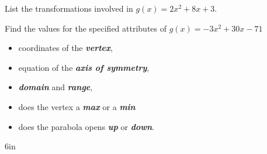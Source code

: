 \myProblems
{
    List the transformations involved in 
    \centering
    $g(x) = 2x^2 + 8x + 3$.
}
{
    Find the values for the specified attributes of
    {
    $g(x) = -3x^2 + 30x - 71$
    }
    \small
    \begin{itemize}[fullwidth,nosep,topsep=0.5\baselineskip]
        \item coordinates of the {\bfseries\itshape vertex},
        \item equation of the {\bfseries\itshape axis of symmetry},
        \item {\bfseries\itshape domain} and {\bfseries\itshape range},
        \item does the vertex a {\bfseries\itshape max} or a {\bfseries\itshape min}
        \item does the parabola opens {\bfseries\itshape up} or {\bfseries\itshape down}.
    \end{itemize}
}
{6in}